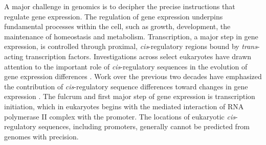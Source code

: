 \documentclass[nogrid]{MBE}%
\begin{document}
A major challenge in genomics is to decipher the precise instructions that regulate gene expression. The regulation of gene expression underpins fundamental processes within the cell, such as growth, development, the maintenance of homeostasis and metabolism. Transcription, a major step in gene expression, is controlled through proximal, \textit{cis}-regulatory regions bound by \textit{trans}-acting transcription factors. Investigations across select eukaryotes have drawn attention to the important role of \textit{cis}-regulatory sequences in the evolution of gene expression differences \citep{Wittkopp:2008ki, Wittkopp:2011bc, Siepel:2014hd}. Work over the previous two decades have emphasized the contribution of \textit{cis}-regulatory sequence differences toward changes in gene expression \citep{Wittkopp:2004cy}. The fulcrum and first major step of gene expression is transcription initiation, which in eukaryotes begins with the mediated interaction of RNA polymerase II complex with the promoter. The locations of eukaryotic \textit{cis}-regulatory sequences, including promoters, generally cannot be predicted from genomes with precision.\\
\end{document}
